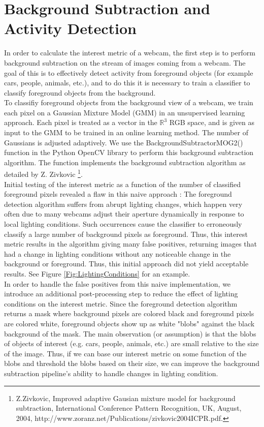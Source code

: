 \documentclass{article}
\begin{document}
\section{Background Subtraction and Activity Detection}
In order to calculate the interest metric of a webcam, the first step is to perform background subtraction on the stream of images coming from a webcam. The goal of this is to effectively detect activity from foreground objects (for example cars, people, animals, etc.), and to do this it is necessary to train a classifier to classify foreground objects from the background. \\

To classifiy foreground objects from the background view of a webcam, we train each pixel on a Gaussian Mixture Model (GMM) in an unsupervised learning approach. Each pixel is treated as a vector in the $\mathbb{R}^3$ RGB space, and is given as input to the GMM to be trained in an online learning method. The number of Gaussians is adjusted adaptively. We use the BackgroundSubtractorMOG2() function in the Python OpenCV library to perform this background subtraction algorithm. The function implements the background subtraction algorithm as detailed by Z. Zivkovic \footnote{Z.Zivkovic, Improved adaptive Gausian mixture model for background subtraction, International Conference Pattern Recognition, UK, August, 2004, http://www.zoranz.net/Publications/zivkovic2004ICPR.pdf.}.\\

Initial testing of the interest metric as a function of the number of classified foreground pixels revealed a flaw in this naive approach : The foreground detection algorithm suffers from abrupt lighting changes, which happen very often due to many webcams adjust their aperture dynamically in response to local lighting conditions. Such occurrences cause the classifier to erroneously classify a large number of background pixels as foreground. Thus, this interest metric results in the algorithm giving many false positives, returning images that had a change in lighting conditions without any noticeable change in the background or foreground. Thus, this initial approach did not yield acceptable results. See Figure \ref{Fig:LightingConditions} for an example. \\

In order to handle the false positives from this naive implementation, we introduce an additional post-processing step to reduce the effect of lighting conditions on the interest metric. Since the foreground detection algorithm returns a mask where background pixels are colored black and foreground pixels are colored white, foreground objects show up as white "blobs" against the black background of the mask. The main observation (or assumption) is that the blobs of objects of interest (e.g. cars, people, animals, etc.) are small relative to the size of the image. Thus, if we can base our interest metric on some function of the blobs and threshold the blobs based on their size, we can improve the background subtraction pipeline's ability to handle changes in lighting condition. \\
\end{document}
